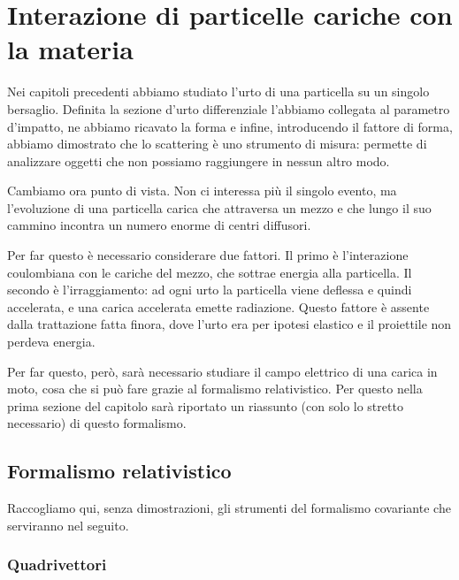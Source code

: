 \chapter{Interazione di particelle cariche con la materia}

Nei capitoli precedenti abbiamo studiato l'urto di una particella su un singolo bersaglio. Definita la sezione d'urto differenziale l'abbiamo collegata al parametro d'impatto, ne abbiamo ricavato la forma e infine, introducendo il fattore di forma, abbiamo dimostrato che lo scattering è uno strumento di misura: permette di analizzare oggetti che non possiamo raggiungere in nessun altro modo.

Cambiamo ora punto di vista. Non ci interessa più il singolo evento, ma l'evoluzione di una particella carica che attraversa un mezzo e che lungo il suo cammino incontra un numero enorme di centri diffusori.

Per far questo è necessario considerare due fattori. Il primo è l'interazione coulombiana con le cariche del mezzo, che sottrae energia alla particella. Il secondo è l'irraggiamento: ad ogni urto la particella viene deflessa e quindi accelerata, e una carica accelerata emette radiazione. Questo fattore è assente dalla trattazione fatta finora, dove l'urto era per ipotesi elastico e il proiettile non perdeva energia.

Per far questo, però, sarà necessario studiare il campo elettrico di una carica in moto, cosa che si può fare grazie al formalismo relativistico. Per questo nella prima sezione del capitolo sarà riportato un riassunto (con solo lo stretto necessario) di questo formalismo. 

\section{Formalismo relativistico}

Raccogliamo qui, senza dimostrazioni, gli strumenti del formalismo covariante che serviranno nel seguito.

\subsection*{Quadrivettori}

